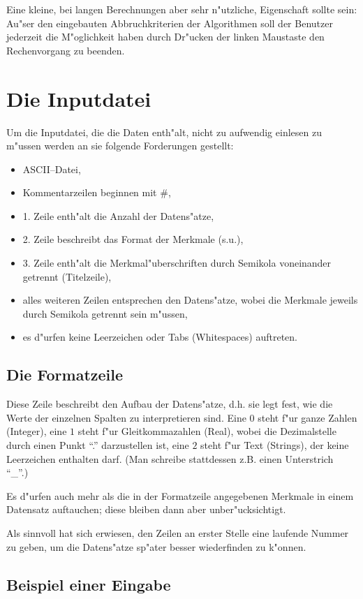 Eine kleine, bei langen Berechnungen aber sehr n"utzliche,
Eigenschaft sollte sein:
Au"ser den eingebauten Abbruchkriterien der Algorithmen soll der Benutzer
jederzeit die M"oglichkeit haben durch Dr"ucken der linken Maustaste den
Rechenvorgang zu beenden.

\section{Die Inputdatei}
Um die Inputdatei, die die Daten enth"alt, nicht zu aufwendig einlesen
zu m"ussen werden an sie folgende Forderungen gestellt:

\begin{itemize}
\item ASCII--Datei,
\item Kommentarzeilen beginnen mit \#,
\item 1. Zeile enth"alt die Anzahl der Datens"atze,
\item 2. Zeile beschreibt das Format der Merkmale (s.u.),
\item 3. Zeile enth"alt die Merkmal"uberschriften durch 
	Semikola voneinander getrennt (Titelzeile),
\item alles weiteren Zeilen entsprechen den  Datens"atze, wobei 
	die Merkmale jeweils durch Semikola getrennt sein m"ussen,
\item es d"urfen keine Leerzeichen oder Tabs (Whitespaces)
	auftreten.
\end{itemize}

\subsection*{Die Formatzeile}
Diese Zeile beschreibt den Aufbau der Datens"atze, d.h. sie legt fest,
wie die Werte der einzelnen Spalten zu interpretieren sind.
Eine $0$ steht f"ur ganze Zahlen (Integer),
eine $1$ steht f"ur Gleitkommazahlen (Real), wobei die Dezimalstelle durch 
	einen Punkt "`."' darzustellen ist,
eine $2$ steht f"ur Text (Strings), der keine Leerzeichen enthalten darf. 
(Man schreibe stattdessen z.B. einen Unterstrich "`\_"'.)

Es d"urfen  auch mehr als die in der Formatzeile angegebenen Merkmale
in einem Datensatz auftauchen; diese bleiben dann aber unber"ucksichtigt.

Als sinnvoll hat sich erwiesen, den Zeilen an erster Stelle eine laufende
Nummer zu geben, um die Datens"atze sp"ater besser wiederfinden zu
k"onnen.

\subsection*{Beispiel einer Eingabe}

